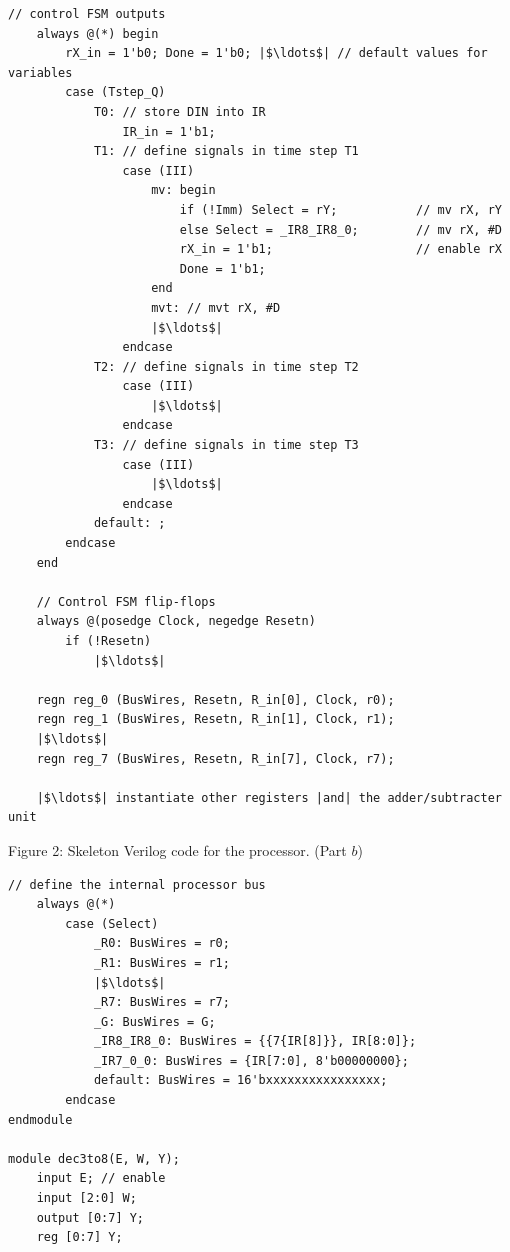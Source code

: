 \documentclass[epsfig,10pt,fullpage]{article} \addtolength{\textwidth}{1.5in}
\begin{document}
\begin{enumerate}
\begin{center}
\begin{minipage}[t]{15 cm}
\begin{lstlisting}[name=proc]
    // control FSM outputs
    always @(*) begin
        rX_in = 1'b0; Done = 1'b0; |$\ldots$| // default values for variables
        case (Tstep_Q)
            T0: // store DIN into IR
                IR_in = 1'b1;
            T1: // define signals in time step T1
                case (III)
                    mv: begin
                        if (!Imm) Select = rY;           // mv rX, rY
                        else Select = _IR8_IR8_0;        // mv rX, #D
                        rX_in = 1'b1;                    // enable rX
                        Done = 1'b1;
                    end
                    mvt: // mvt rX, #D
                    |$\ldots$|
                endcase
            T2: // define signals in time step T2
                case (III)
                    |$\ldots$|
                endcase
            T3: // define signals in time step T3
                case (III)
                    |$\ldots$|
                endcase
            default: ;
        endcase
    end

    // Control FSM flip-flops
    always @(posedge Clock, negedge Resetn)
        if (!Resetn)
            |$\ldots$|

    regn reg_0 (BusWires, Resetn, R_in[0], Clock, r0);
    regn reg_1 (BusWires, Resetn, R_in[1], Clock, r1);
    |$\ldots$|
    regn reg_7 (BusWires, Resetn, R_in[7], Clock, r7);

    |$\ldots$| instantiate other registers |and| the adder/subtracter unit
\end{lstlisting}
\end{minipage}
\end{center}

\begin{center}
Figure 2: Skeleton Verilog code for the processor. (Part $b$)
\end{center}

\begin{center}
\begin{minipage}[t]{15 cm}
\begin{lstlisting}[name=proc]
    // define the internal processor bus
    always @(*)
        case (Select)
            _R0: BusWires = r0;
            _R1: BusWires = r1;
            |$\ldots$|
            _R7: BusWires = r7;
            _G: BusWires = G;
            _IR8_IR8_0: BusWires = {{7{IR[8]}}, IR[8:0]}; 
            _IR7_0_0: BusWires = {IR[7:0], 8'b00000000};
            default: BusWires = 16'bxxxxxxxxxxxxxxxx;
        endcase
endmodule

module dec3to8(E, W, Y);
    input E; // enable
    input [2:0] W;
    output [0:7] Y;
    reg [0:7] Y;
   

\end{lstlisting}
\end{minipage}
\end{center}
\end{enumerate}
\end{document}

